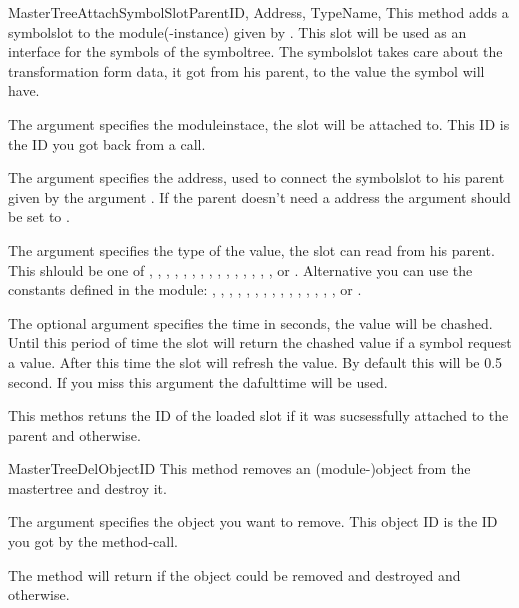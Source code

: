 \begin{methoddesc}[Core]{MasterTreeAttachSymbolSlot}{ParentID, Address, TypeName, }
This method adds a symbolslot to the module(-instance) given by . This slot will be used 
as an interface for the symbols of the symboltree. The symbolslot takes care about the transformation 
form data, it got from his parent, to the value the symbol will have. 

The argument  specifies the moduleinstace, the slot will be attached to. This ID is the ID
you got back from a  call.

The argument  specifies the address, used to connect the symbolslot to his parent given by the 
argument . If the parent doesn't need a address the argument should be set to . 

The argument  specifies the type of the value, the slot can read from his parent. This shlould be one of , , 
, , , , ,
, , , , , , , ,
 or . Alternative you can use the constants defined in the  module: , , , 
, , , , , , , , 
, , , ,  or . 

The optional argument  specifies the time in seconds, the value will be chashed. Until this period of time the slot will return the chashed value 
if a symbol request a value. After this time the slot will refresh the value. By default this will be 0.5 second. If you miss this argument the dafulttime will
be used.

This methos retuns the ID of the loaded slot if it was sucsessfully attached to the parent and  otherwise.
\end{methoddesc}




\begin{methoddesc}[Core]{MasterTreeDel}{ObjectID}
This method removes an (module-)object from the mastertree and destroy it. 

The argument  specifies the object you want to remove. This object ID is the ID you got by the  
method-call.

The method will return  if the object could be removed and destroyed and  otherwise.
\end{methoddesc}



